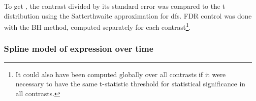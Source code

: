 %
% 
To get \pvalues{}, the contrast divided by its standard error was compared to the t distribution using the Satterthwaite approximation for \glspl{df}.
\Gls{FDR} control was done with the \gls{BH} method, computed separately for each contrast\footnote{
It could also have been computed globally over all contrasts if it were necessary to have the same t-statistic threshold for statistical significance in all contrasts.
}.


\subsubsection{Spline model of expression over time}


